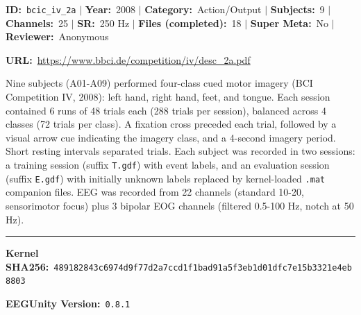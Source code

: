 
{\setlength{\parskip}{2pt}\setlength{\parindent}{0pt}
\noindent\begin{tcolorbox}[breakable,enhanced,colback=white,colframe=gray!55,boxrule=0.9pt,arc=4pt,left=6pt,right=6pt,top=4pt,bottom=4pt,title={\small\bfseries BCI Competition IV Dataset 2a (4-Class Motor Imagery)\hfill \colorbox{gray!20}{\scriptsize\sffamily\bfseries Completed}},coltitle=black,colbacktitle=gray!12,titlerule=0.5pt]
{\footnotesize \textbf{ID:}~\texttt{bcic\_iv\_2a} $\mid$ \textbf{Year:}~2008 $\mid$ \textbf{Category:}~Action/Output $\mid$ \textbf{Subjects:}~9 $\mid$ \textbf{Channels:}~25 $\mid$ \textbf{SR:}~250 Hz $\mid$ \textbf{Files (completed):}~18 $\mid$ \textbf{Super Meta:}~No $\mid$ \textbf{Reviewer:}~Anonymous}
\par{\footnotesize\textbf{URL:}~\url{https://www.bbci.de/competition/iv/desc_2a.pdf}}
\tcbline
{}\par\smallskip
{\footnotesize Nine subjects (A01-A09) performed four-class cued motor imagery (BCI Competition IV, 2008): left hand, right hand, feet, and tongue. Each session contained 6 runs of 48 trials each (288 trials per session), balanced across 4 classes (72 trials per class). A fixation cross preceded each trial, followed by a visual arrow cue indicating the imagery class, and a 4-second imagery period. Short resting intervals separated trials. Each subject was recorded in two sessions: a training session (suffix \texttt{T.gdf}) with event labels, and an evaluation session (suffix \texttt{E.gdf}) with initially unknown labels replaced by kernel-loaded \texttt{.mat} companion files. EEG was recorded from 22 channels (standard 10-20, sensorimotor focus) plus 3 bipolar EOG channels (filtered 0.5-100 Hz, notch at 50 Hz).}
\noindent\rule{\linewidth}{0.4pt}\par\nopagebreak
{}\par\smallskip
{\scriptsize
\noindent\textbf{Kernel SHA256:}~\texttt{489182843c6974d9f77d2a7ccd1f1bad91a5f3eb1d01dfc7e15b3321e4eb8803}\par\smallskip
\noindent\textbf{EEGUnity Version:}~\texttt{0.8.1}\par\smallskip
}
\end{tcolorbox}}

